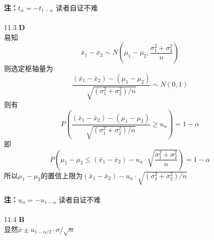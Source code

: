 \documentclass[a4paper]{ctexart}    %
\begin{document}
	\textbf{注：}$ t_{\alpha} = - t_{1 - \alpha} $ \qquad 读者自证不难\\ \\
	11.3 \quad \textbf{D} \\
	易知
	\begin{equation*}
		\bar{x}_1 - \bar{x}_2 \sim N \left(\mu_1 - \mu_2, \frac{\sigma_1^2 + \sigma_2^2}{n} \right)
	\end{equation*}
	则选定枢轴量为
	\begin{equation*}
		\frac{(\bar{x}_1 - \bar{x}_2) - (\mu_1 - \mu_2)}{\sqrt{(\sigma_1^2 + \sigma_2^2) / n}} \sim N(0, 1)
	\end{equation*}
	则有
	\begin{equation*}
		P \left( \frac{(\bar{x}_1 - \bar{x}_2) - (\mu_1 - \mu_2)}{\sqrt{(\sigma_1^2 + \sigma_2^2) / n}} \geq u_{\alpha} \right) = 1 - \alpha
	\end{equation*}
	即
	\begin{equation*}
		P \left(\mu_1 - \mu_2 \leq (\bar{x}_1 - \bar{x}_2) - u_{\alpha} \cdot \sqrt{\frac{\sigma_1^2 + \sigma_2^2}{n}}\right) = 1 - \alpha
	\end{equation*}
	所以$ \mu_1 - \mu_2 $的置信上限为$ (\bar{x}_1 - \bar{x}_2) - u_{\alpha} \cdot \sqrt{(\sigma_1^2 + \sigma_2^2) / n} $ \\ \\
	\textbf{注：}$ u_{\alpha} = - u_{1 - \alpha} $ \qquad 读者自证不难\\ \\
	11.4 \quad \textbf{B} \\
	显然$ \bar{x} \pm u_{1-\alpha / 2} \cdot \sigma / \sqrt{n} $ \\ \\ 
	\newpage
\end{document}
